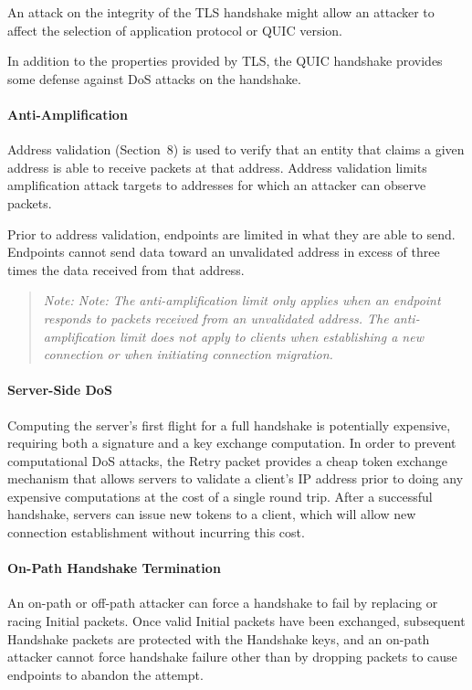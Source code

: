 \documentclass{article}
\begin{document}
An attack on the integrity of the TLS handshake might allow an attacker to affect the selection of application protocol or QUIC version.

In addition to the properties provided by TLS, the QUIC handshake provides some defense against DoS attacks on the handshake.

\paragraph{Anti-Amplification}

Address validation (Section~8) is used to verify that an entity that claims a given address is able to receive packets at that address. Address validation limits amplification attack targets to addresses for which an attacker can observe packets.

Prior to address validation, endpoints are limited in what they are able to send.  Endpoints cannot send data toward an unvalidated address in excess of three times the data received from that address.

\begin{quote}
\textit{Note: Note: The anti-amplification limit only applies when an endpoint responds to packets received from an unvalidated address.  The anti-amplification limit does not apply to clients when establishing a new connection or when initiating connection migration.}
\end{quote}

\paragraph{Server-Side DoS}

Computing the server's first flight for a full handshake is potentially expensive, requiring both a signature and a key exchange computation.  In order to prevent computational DoS attacks, the Retry packet provides a cheap token exchange mechanism that allows servers to validate a client's IP address prior to doing any expensive computations at the cost of a single round trip.  After a successful handshake, servers can issue new tokens to a client, which will allow new connection establishment without incurring this cost.

\paragraph{On-Path Handshake Termination}

An on-path or off-path attacker can force a handshake to fail by replacing or racing Initial packets.  Once valid Initial packets have been exchanged, subsequent Handshake packets are protected with the Handshake keys, and an on-path attacker cannot force handshake failure other than by dropping packets to cause endpoints to abandon the attempt.
\end{document}

